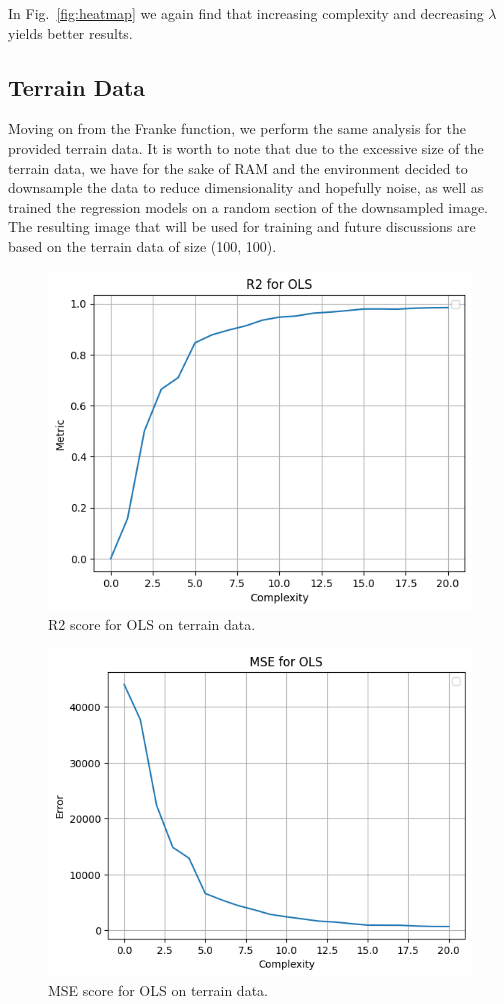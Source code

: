 \documentclass[aps,rmp,reprint,amsmath,amssymb,graphicx,longbibliography]{revtex4-1}
\begin{document}
In Fig.~\ref{fig:heatmap} we again find that increasing complexity and decreasing $\lambda$ yields better results.

\subsection{Terrain Data}

Moving on from the Franke function, we perform the same analysis for the provided terrain data. It is worth to note that due to the excessive size of the terrain data, we have for the sake of RAM and the environment decided to downsample the data to reduce dimensionality and hopefully noise, as well as trained the regression models on a random section of the downsampled image. The resulting image that will be used for training and future discussions are based on the terrain data of size (100, 100). 

\begin{figure}[H]
    \centering
    \includegraphics[width=0.6\linewidth]{Project_1/figures/R2_ols_terrain.png}
    \caption{R2 score for OLS on terrain data.}
    \label{fig:r2_terrain_ols}
\end{figure}

\begin{figure}[H]
    \centering
    \includegraphics[width=0.6\linewidth]{Project_1/figures/mse_ols_terrain.png}
    \caption{MSE score for OLS on terrain data.}
    \label{fig:mse_terrain_ols}
\end{figure}
\end{document}
